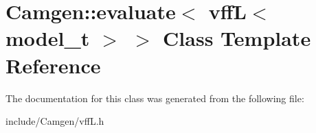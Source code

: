 \hypertarget{a00205}{}\section{Camgen\+:\+:evaluate$<$ vff\+L$<$ model\+\_\+t $>$ $>$ Class Template Reference}
\label{a00205}


The documentation for this class was generated from the following file\+:\begin{DoxyCompactItemize}
\item 
include/\+Camgen/vff\+L.\+h\end{DoxyCompactItemize}
